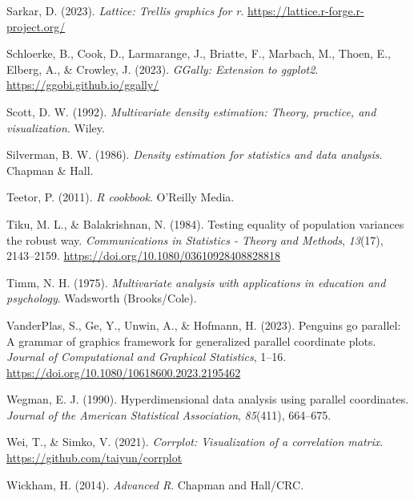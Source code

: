 \documentclass[
  letterpaper,
  10pt,
  krantz2]{krantz}
\newlength{\cslhangindent}
\newlength{\cslentryspacingunit} %
\newenvironment{CSLReferences}[2] %
 {%
  \setlength{\parindent}{0pt}
  \ifodd #1
  \let\oldpar\par
  \def\par{\hangindent=\cslhangindent\oldpar}
  \fi
  \setlength{\parskip}{#2\cslentryspacingunit}
 }%
 {}
\begin{document}
\begin{CSLReferences}{1}{0}
\leavevmode{}%
Sarkar, D. (2023). \emph{Lattice: Trellis graphics for r}.
\url{https://lattice.r-forge.r-project.org/}

\leavevmode{}%
Schloerke, B., Cook, D., Larmarange, J., Briatte, F., Marbach, M.,
Thoen, E., Elberg, A., \& Crowley, J. (2023). \emph{GGally: Extension to
ggplot2}. \url{https://ggobi.github.io/ggally/}

\leavevmode{}%
Scott, D. W. (1992). \emph{Multivariate density estimation: Theory,
practice, and visualization}. Wiley.

\leavevmode{}%
Silverman, B. W. (1986). \emph{Density estimation for statistics and
data analysis}. Chapman \& Hall.

\leavevmode{}%
Teetor, P. (2011). \emph{{R cookbook}}. {O'Reilly} Media.

\leavevmode{}%
Tiku, M. L., \& Balakrishnan, N. (1984). Testing equality of population
variances the robust way. \emph{Communications in Statistics - Theory
and Methods}, \emph{13}(17), 2143--2159.
\url{https://doi.org/10.1080/03610928408828818}

\leavevmode{}%
Timm, N. H. (1975). \emph{Multivariate analysis with applications in
education and psychology}. Wadsworth (Brooks/Cole).

\leavevmode{}%
VanderPlas, S., Ge, Y., Unwin, A., \& Hofmann, H. (2023). Penguins go
parallel: A grammar of graphics framework for generalized parallel
coordinate plots. \emph{Journal of Computational and Graphical
Statistics}, 1--16. \url{https://doi.org/10.1080/10618600.2023.2195462}

\leavevmode{}%
Wegman, E. J. (1990). Hyperdimensional data analysis using parallel
coordinates. \emph{Journal of the American Statistical Association},
\emph{85}(411), 664--675.

\leavevmode{}%
Wei, T., \& Simko, V. (2021). \emph{Corrplot: Visualization of a
correlation matrix}. \url{https://github.com/taiyun/corrplot}

\leavevmode{}%
Wickham, H. (2014). \emph{{Advanced R}}. {Chapman and Hall/CRC}.


\end{CSLReferences}
\end{document}
